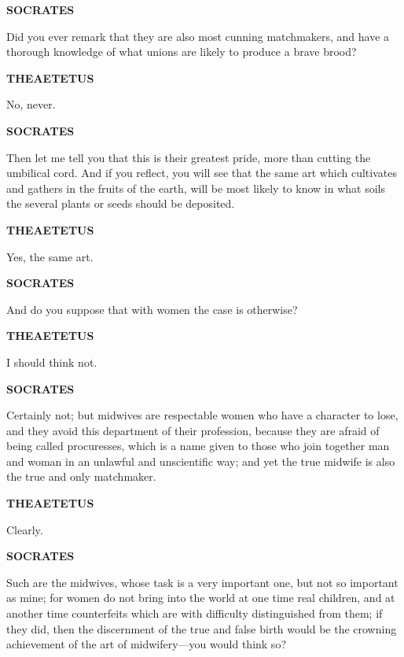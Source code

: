 \documentclass[11pt,letter]{article}
\begin{document}
\par \textbf{SOCRATES}
\par   Did you ever remark that they are also most cunning matchmakers, and have a thorough knowledge of what unions are likely to produce a brave brood?

\par \textbf{THEAETETUS}
\par   No, never.

\par \textbf{SOCRATES}
\par   Then let me tell you that this is their greatest pride, more than cutting the umbilical cord. And if you reflect, you will see that the same art which cultivates and gathers in the fruits of the earth, will be most likely to know in what soils the several plants or seeds should be deposited.

\par \textbf{THEAETETUS}
\par   Yes, the same art.

\par \textbf{SOCRATES}
\par   And do you suppose that with women the case is otherwise?

\par \textbf{THEAETETUS}
\par   I should think not.

\par \textbf{SOCRATES}
\par   Certainly not; but midwives are respectable women who have a character to lose, and they avoid this department of their profession, because they are afraid of being called procuresses, which is a name given to those who join together man and woman in an unlawful and unscientific way; and yet the true midwife is also the true and only matchmaker.

\par \textbf{THEAETETUS}
\par   Clearly.

\par \textbf{SOCRATES}
\par   Such are the midwives, whose task is a very important one, but not so important as mine; for women do not bring into the world at one time real children, and at another time counterfeits which are with difficulty distinguished from them; if they did, then the discernment of the true and false birth would be the crowning achievement of the art of midwifery—you would think so?
\end{document}
